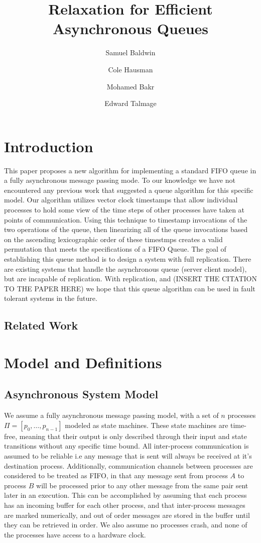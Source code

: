 \documentclass[a4paper,USenglish]{lipics-v2021} %
\title{Relaxation for Efficient Asynchronous Queues}
\author{Samuel Baldwin}{Bucknell University, USA}{}{https://orcid.org/0000-0002-1825-0097}{}
\author{Cole Hausman}{Bucknell University, USA}{}{[orcid]}{}
\author{Mohamed Bakr}{Bucknell University, USA}{}{ORCID}{}
\author{Edward Talmage}{Bucknell Univserity, USA}{elt006@bucknell.edu}{ORCID}{}
\begin{document}
\maketitle

\section{Introduction}

This paper proposes a new algorithm for implementing a standard FIFO queue in a fully asynchronous message passing mode. To our knowledge we have not encountered any previous work that suggested a queue algorithm for this specific model. Our algorithm utilizes vector clock timestamps that allow individual processes to hold some view of the time steps of other processes have taken at points of communication. Using this technique to timestamp invocations of the two operations of the queue, then linearizing all of the queue invocations based on the ascending lexicographic order of these timestmps creates a valid permutation that meets the specifications of a FIFO Queue.  The goal of establishing this queue method is to design a system with full replication. There are existing systems that handle the asynchronous queue (server client model), but are incapable of replication. With replication, and (INSERT THE CITATION TO THE PAPER HERE) we hope that this queue algorithm can be used in fault tolerant systems in the future.

\subsection{Related Work}

\section{Model and Definitions}

\subsection{Asynchronous System Model}
We assume a fully asynchronous message passing model, with a set of $n$ processes $\Pi = [p_0, \dots , p_{n-1}]$ modeled as state machines. These state machines are time-free, meaning that their output is only described through their input and state transitions without any specific time bound. All inter-process communication is assumed to be reliable i.e any message that is sent will always be received at it’s destination process.  Additionally, communication channels between processes are considered to be treated as FIFO, in that any message sent from process $A$ to process $B$ will be processed prior to any other message from the same pair sent later in an execution. This can be accomplished by assuming that each process has an incoming buffer for each other process, and that inter-process messages are marked numerically, and out of order messages are stored in the buffer until they can be retrieved in order.  We also assume no processes crash, and none of the processes have access to a hardware clock.
\end{document}
